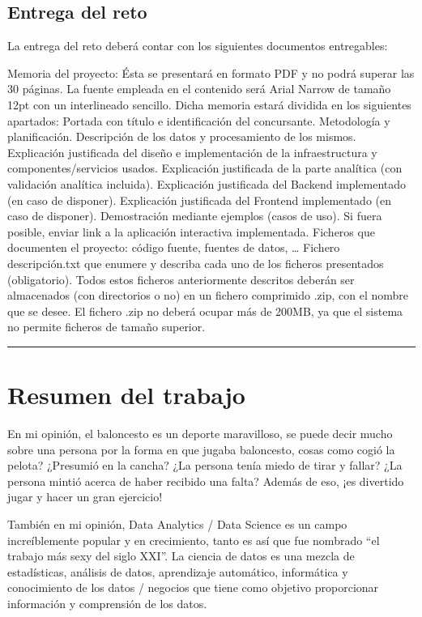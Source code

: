 \documentclass[]{article}
\begin{document}
\subsection{Entrega del reto}\label{entrega-del-reto}

La entrega del reto deberá contar con los siguientes documentos
entregables:

Memoria del proyecto: Ésta se presentará en formato PDF y no podrá
superar las 30 páginas. La fuente empleada en el contenido será Arial
Narrow de tamaño 12pt con un interlineado sencillo. Dicha memoria estará
dividida en los siguientes apartados: Portada con título e
identificación del concursante. Metodología y planificación. Descripción
de los datos y procesamiento de los mismos. Explicación justificada del
diseño e implementación de la infraestructura y componentes/servicios
usados. Explicación justificada de la parte analítica (con validación
analítica incluida). Explicación justificada del Backend implementado
(en caso de disponer). Explicación justificada del Frontend implementado
(en caso de disponer). Demostración mediante ejemplos (casos de uso). Si
fuera posible, enviar link a la aplicación interactiva implementada.
Ficheros que documenten el proyecto: código fuente, fuentes de datos,
\ldots{} Fichero descripción.txt que enumere y describa cada uno de los
ficheros presentados (obligatorio). Todos estos ficheros anteriormente
descritos deberán ser almacenados (con directorios o no) en un fichero
comprimido .zip, con el nombre que se desee. El fichero .zip no deberá
ocupar más de 200MB, ya que el sistema no permite ficheros de tamaño
superior.

\begin{center}\rule{0.5\linewidth}{\linethickness}\end{center}

\section{Resumen del trabajo}\label{resumen-del-trabajo}

En mi opinión, el baloncesto es un deporte maravilloso, se puede decir
mucho sobre una persona por la forma en que jugaba baloncesto, cosas
como cogió la pelota? ¿Presumió en la cancha? ¿La persona tenía miedo de
tirar y fallar? ¿La persona mintió acerca de haber recibido una falta?
Además de eso, ¡es divertido jugar y hacer un gran ejercicio!

También en mi opinión, Data Analytics / Data Science es un campo
increíblemente popular y en crecimiento, tanto es así que fue nombrado
``el trabajo más sexy del siglo XXI''. La ciencia de datos es una mezcla
de estadísticas, análisis de datos, aprendizaje automático, informática
y conocimiento de los datos / negocios que tiene como objetivo
proporcionar información y comprensión de los datos.
\end{document}
